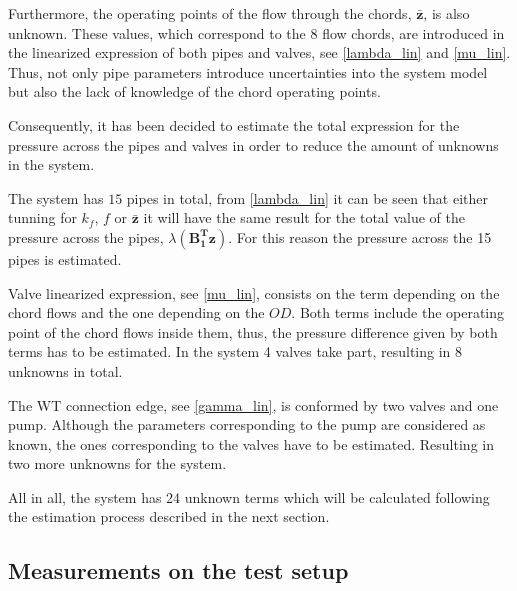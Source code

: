 %


Furthermore, the operating points of the flow through the chords, $\pmb{\bar{z}}$, is also unknown. These values, which correspond to the $8$ flow chords, are introduced in the linearized expression of both pipes 
and valves, see \eqref{lambda_lin} and \eqref{mu_lin}. Thus, not only pipe parameters introduce uncertainties into the system model but also the lack of knowledge of the chord operating points.

Consequently, it has been decided to estimate the total expression for the pressure across the pipes and valves in order to reduce the amount of unknowns in the system.

The system has $15$ pipes in total,  from \eqref{lambda_lin} it can be seen that either tunning for $k_f$, $f$ or $\pmb{\bar{z}}$ it will have the same result for the total
value of the pressure across the pipes, $\lambda(\pmb{{B_1^{T}}}\pmb{z})$. For this reason the pressure across the 15 pipes is estimated.

Valve linearized expression, see \eqref{mu_lin}, consists on the term depending on the chord flows and the one depending on the $OD$. Both terms include the operating 
point of the chord flows inside them, thus, the pressure difference given by both terms has to be estimated. In the system 4 valves take part, 
resulting in 8 unknowns in total. 

The WT connection edge, see \eqref{gamma_lin}, is conformed by two valves and one pump. Although the parameters corresponding to the pump are considered as known, the ones 
corresponding to the valves have to be estimated. Resulting in two more unknowns for the system. 

All in all, the system has $24$ unknown terms which will be calculated following the estimation process described in the next section.
\subsection{Measurements on the test setup}
\label{LinParamEst_measurements}

